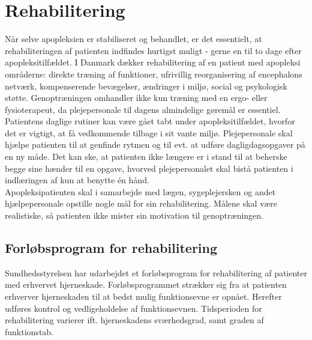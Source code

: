 \section{Rehabilitering}
Når selve apopleksien er stabiliseret og behandlet, er det essentielt, at rehabiliteringen af patienten indfindes hurtigst muligt - gerne en til to dage efter apopleksitilfældet. I Danmark dækker rehabilitering af en patient med apopleksi områderne: direkte træning af funktioner, ufrivillig reorganisering af encephalons netværk, kompenserende bevægelser, ændringer i miljø, social og psykologisk støtte. Genoptræningen omhandler ikke kun træning med en ergo- eller fysioterapeut, da plejepersonale til dagens almindelige gøremål er essentiel. Patientens daglige rutiner kan være gået tabt under apopleksitilfældet, hvorfor det er vigtigt, at få vedkommende tilbage i sit vante miljø. Plejepersonale skal hjælpe patienten til at genfinde rytmen og til evt. at udføre dagligdagsopgaver på en ny måde. Det kan ske, at patienten ikke længere er i stand til at beherske begge sine hænder til en opgave, hvorved plejepersonalet skal bistå patienten i indlæringen af kun at benytte én hånd. \cite{Kruuse2015} \\
Apopleksipatienten skal i samarbejde med lægen, sygeplejersken og andet hjælpepersonale opstille nogle mål for sin rehabilitering. Målene skal være realistiske, så patienten ikke mister sin motivation til genoptræningen. \cite{Kruuse2015}

\subsection{Forløbsprogram for rehabilitering} 
Sundhedsstyrelsen har udarbejdet et forløbsprogram for rehabilitering af patienter med erhvervet hjerneskade. Forløbsprogrammet strækker sig fra at patienten erhverver hjerneskaden til at bedst mulig funktionsevne er opnået. Herefter udføres kontrol og vedligeholdelse af funktionsevnen. Tidsperioden for rehabilitering varierer ift. hjerneskadens sværhedsgrad, samt graden af funktionstab. %
\cite{Sundhedsstyrelsen2011a}


